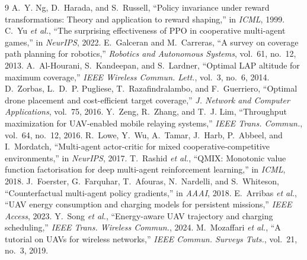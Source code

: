 \documentclass[conference]{IEEEtran}
\begin{document}
\begin{thebibliography}{9}
 A.~Y. Ng, D.~Harada, and S.~Russell, ``Policy invariance under reward transformations: Theory and application to reward shaping,'' in \emph{ICML}, 1999.
 C.~Yu \emph{et al.}, ``The surprising effectiveness of PPO in cooperative multi-agent games,'' in \emph{NeurIPS}, 2022.
 E.~Galceran and M.~Carreras, ``A survey on coverage path planning for robotics,'' \emph{Robotics and Autonomous Systems}, vol.~61, no.~12, 2013.
 A.~Al-Hourani, S.~Kandeepan, and S.~Lardner, ``Optimal LAP altitude for maximum coverage,'' \emph{IEEE Wireless Commun. Lett.}, vol.~3, no.~6, 2014.
 D.~Zorbas, L.~D.~P. Pugliese, T.~Razafindralambo, and F.~Guerriero, ``Optimal drone placement and cost-efficient target coverage,'' \emph{J. Network and Computer Applications}, vol.~75, 2016.
 Y.~Zeng, R.~Zhang, and T.~J. Lim, ``Throughput maximization for UAV-enabled mobile relaying systems,'' \emph{IEEE Trans. Commun.}, vol.~64, no.~12, 2016.
 R.~Lowe, Y.~Wu, A.~Tamar, J.~Harb, P.~Abbeel, and I.~Mordatch, ``Multi-agent actor-critic for mixed cooperative-competitive environments,'' in \emph{NeurIPS}, 2017.
 T.~Rashid \emph{et al.}, ``QMIX: Monotonic value function factorisation for deep multi-agent reinforcement learning,'' in \emph{ICML}, 2018.
 J.~Foerster, G.~Farquhar, T.~Afouras, N.~Nardelli, and S.~Whiteson, ``Counterfactual multi-agent policy gradients,'' in \emph{AAAI}, 2018.
 E.~Arribas \emph{et al.}, ``UAV energy consumption and charging models for persistent missions,'' \emph{IEEE Access}, 2023.
 Y.~Song \emph{et al.}, ``Energy-aware UAV trajectory and charging scheduling,'' \emph{IEEE Trans. Wireless Commun.}, 2024.
 M.~Mozaffari \emph{et al.}, ``A tutorial on UAVs for wireless networks,'' \emph{IEEE Commun. Surveys Tuts.}, vol.~21, no.~3, 2019.
\end{thebibliography}
\end{document}
